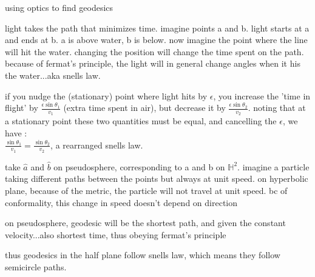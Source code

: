 \documentclass{article}
\newenvironment{andrew_section}[1]
    {
    \section{#1}
    \begin{itemize}
    }
    {
    \end{itemize}
    }
\begin{document}
\begin{andrew_section}{using optics to find geodesics}
    \item 
        light takes the path that minimizes time.  imagine points a and b.
        light starts at a and ends at b.  a is above water, b is below.
        now imagine the point where the line will hit the water.
        changing the position will change the time spent on the path.
        because of fermat's principle, the light will in general 
        change angles when it his the water...aka snells law.
    \item 
        if you nudge the (stationary) point where light hits by $\epsilon$,
        you increase the 'time in flight' by 
        $ \frac{\epsilon \sin{\theta_1}}{v_1}$ (extra time spent in air), 
        but decrease it by $ \frac{\epsilon \sin{\theta_2}}{v_2}$. noting
        that at a stationary point these two quantities must be equal, and
        cancelling the $\epsilon$, we have : \\
        $\frac{ \sin{\theta_1}}{v_1} = \frac{ \sin{\theta_2}}{v_2}$, a 
        rearranged snells law.
    \item 
        take $\hat{a}$ and $\hat{b}$ on pseudosphere, corresponding to
        a and b on $\mathbb{H}^2$.  imagine a particle taking different
        paths between the points but always at unit speed. on hyperbolic
        plane, because of the metric, the particle will not travel at unit
        speed. bc of conformality, this change in speed doesn't depend on direction
    \item 
        on pseudosphere, geodesic will be the shortest path, and given the constant
        velocity...also shortest time, thus obeying fermat's principle
    \item 
        thus geodesics in the half plane follow snells law, which means
        they follow semicircle paths.
\end{andrew_section}
\end{document}

